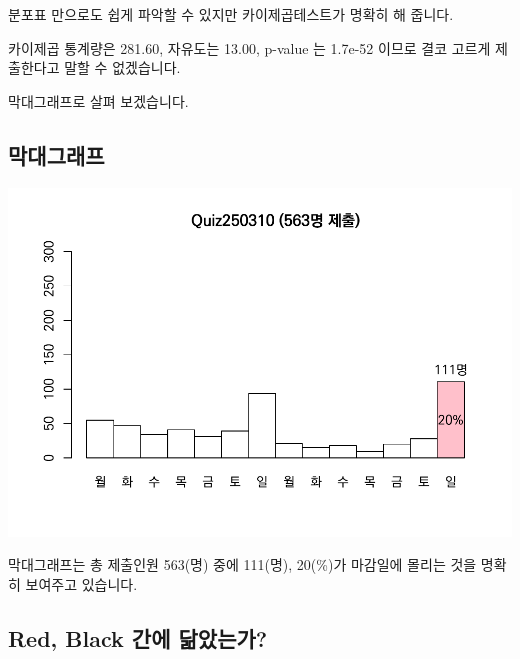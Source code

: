 \documentclass[
]{book}
\begin{document}
분포표 만으로도 쉽게 파악할 수 있지만 카이제곱테스트가 명확히 해 줍니다.

카이제곱 통계량은 281.60, 자유도는 13.00, p-value 는 1.7e-52 이므로 결코 고르게 제출한다고 말할 수 없겠습니다.

막대그래프로 살펴 보겠습니다.

\subsection{막대그래프}\label{uxb9c9uxb300uxadf8uxb798uxd504-1}

\includegraphics{Quiz_report_2025_files/figure-latex/unnamed-chunk-40-1.pdf}

막대그래프는 총 제출인원 563(명) 중에 111(명), 20(\%)가 마감일에 몰리는 것을 명확히 보여주고 있습니다.

\subsection{Red, Black 간에 닮았는가?}\label{red-black-uxac04uxc5d0-uxb2eeuxc558uxb294uxac00-1}
\end{document}
